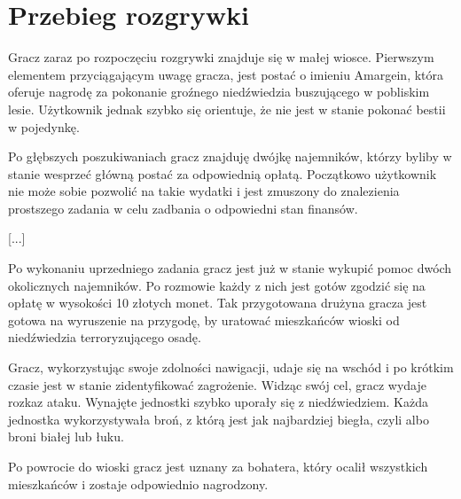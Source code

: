 \section{Przebieg rozgrywki}
Gracz zaraz po rozpoczęciu rozgrywki znajduje się w małej wiosce. Pierwszym
elementem przyciągającym uwagę gracza, jest postać o imieniu Amargein, która oferuje
nagrodę za pokonanie groźnego niedźwiedzia buszującego w pobliskim lesie. Użytkownik jednak
szybko się orientuje, że nie jest w stanie pokonać bestii w pojedynkę.

Po głębszych poszukiwaniach gracz znajduję dwójkę najemników, którzy byliby w stanie
wesprzeć główną postać za odpowiednią opłatą. Początkowo użytkownik nie może sobie
pozwolić na takie wydatki i jest zmuszony do znalezienia prostszego zadania
w celu zadbania o odpowiedni stan finansów.

[...]

Po wykonaniu uprzedniego zadania gracz jest już w stanie wykupić pomoc dwóch okolicznych
najemników. Po rozmowie każdy z nich jest gotów zgodzić się na opłatę w wysokości 10 złotych monet.
Tak przygotowana drużyna gracza jest gotowa na wyruszenie na przygodę, by uratować
mieszkańców wioski od niedźwiedzia terroryzującego osadę.

Gracz, wykorzystując swoje zdolności nawigacji, udaje się na wschód i po krótkim czasie jest w stanie zidentyfikować zagrożenie.
Widząc swój cel, gracz wydaje rozkaz ataku. Wynajęte jednostki szybko uporały się z niedźwiedziem. Każda jednostka wykorzystywała
broń, z którą jest jak najbardziej biegła, czyli albo broni białej lub łuku.

Po powrocie do wioski gracz jest uznany za bohatera, który ocalił wszystkich mieszkańców i zostaje odpowiednio nagrodzony.

